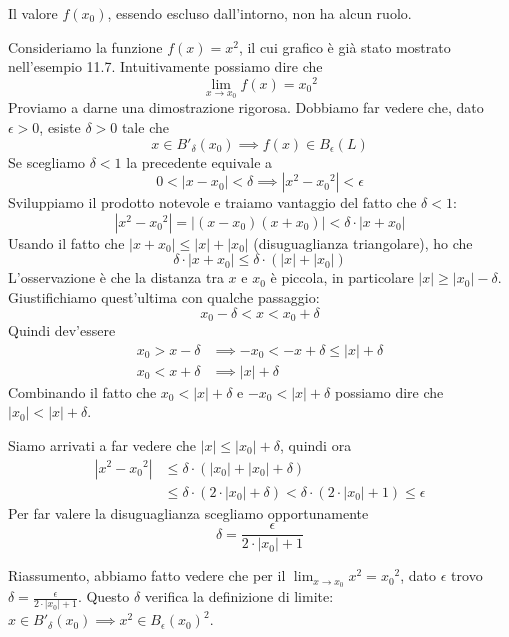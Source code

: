 \begin{remark}
Il valore $f(x_0)$, essendo escluso dall'intorno, non ha alcun ruolo.
\end{remark}

\begin{example}
Consideriamo la funzione $f(x) = x^2$, il cui grafico è già stato mostrato nell'esempio 11.7. Intuitivamente possiamo dire che
\begin{equation*}
\lim_{x \to x_0} f(x) = {x_0}^2
\end{equation*}
Proviamo a darne una dimostrazione rigorosa. Dobbiamo far vedere che, dato $\epsilon > 0$, esiste $\delta > 0$ tale che
\begin{equation*}
x \in B'_\delta (x_0) \implies f(x) \in B_\epsilon (L)
\end{equation*}
Se scegliamo $\delta < 1$ la precedente equivale a
\begin{equation*}
0 < |x - x_0| < \delta \implies |x^2 - {x_0}^2| < \epsilon
\end{equation*}
Sviluppiamo il prodotto notevole e traiamo vantaggio del fatto che $\delta < 1$:
\begin{equation*}
|x^2-{x_0}^2| = |(x-x_0)(x+x_0)| < \delta \cdot |x+x_0|
\end{equation*}
Usando il fatto che $|x+x_0| \le |x| + |x_0|$ (disuguaglianza triangolare), ho che
\begin{equation*}
\delta \cdot |x+x_0| \le \delta \cdot (|x| + |x_0|) 
\end{equation*}
L'osservazione è che la distanza tra $x$ e $x_0$ è piccola, in particolare $|x| \ge |x_0| - \delta$. Giustifichiamo quest'ultima con qualche passaggio:
\begin{equation*}
x_0 - \delta < x < x_0 + \delta
\end{equation*}
Quindi dev'essere
\begin{align*}
x_0 > x - \delta &\implies -x_0 < -x + \delta \le |x| + \delta \\
x_0 < x + \delta &\implies |x| + \delta
\end{align*}
Combinando il fatto che $x_0 < |x| + \delta$ e $-x_0 < |x| + \delta$ possiamo dire che $|x_0| < |x| + \delta$.

Siamo arrivati a far vedere che $|x| \le |x_0| + \delta$, quindi ora
\begin{align*}
|x^2 - {x_0}^2| &\le \delta \cdot (|x_0| + |x_0| + \delta) \\
&\le \delta \cdot (2 \cdot |x_0| + \delta) < \delta \cdot (2 \cdot |x_0| + 1) \le \epsilon
\end{align*}
Per far valere la disuguaglianza scegliamo opportunamente 
\begin{equation*}
\delta = \frac{\epsilon}{2 \cdot |x_0| + 1}
\end{equation*}

Riassumento, abbiamo fatto vedere che per il $\lim_{x \to x_0} x^2 = {x_0}^2$, dato $\epsilon$ trovo $\delta = \frac{\epsilon}{2 \cdot |x_0| + 1}$. Questo $\delta$ verifica la definizione di limite: $x \in B'_\delta (x_0) \implies x^2 \in B_\epsilon (x_0)^2$.
\end{example}


